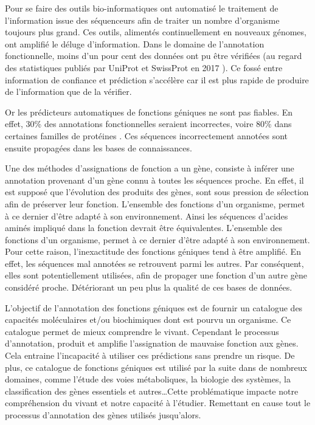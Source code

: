\begin{refsection}
Pour se faire des outils bio-informatiques ont automatisé le traitement de l'information issue des séquenceurs afin de traiter un nombre d'organisme toujours plus grand. Ces outils, alimentés continuellement en nouveaux génomes, ont amplifié le déluge d'information. Dans le domaine de l'annotation fonctionnelle, moins d'un pour cent des données ont pu être vérifiées (au regard des statistiques publiés par UniProt et SwissProt en 2017 \parencites{uniprot_stat}{expasy_stat} ). Ce fossé entre information de confiance et prédiction s'accélère car il est plus rapide de produire de l'information que de la vérifier.

Or les prédicteurs automatiques de fonctions géniques ne sont pas fiables. En effet, 30\% des annotations fonctionnelles seraient incorrectes, voire 80\% dans certaines familles de protéines \parencites{devos2001intrinsic}{schnoes2009annotation}. Ces séquences incorrectement annotées sont ensuite propagées dans les bases de connaissances.

Une des méthodes d'assignations de fonction a un gène, consiste à inférer une annotation provenant d'un gène connu à toutes les séquences proche. En effet, il est supposé que l'évolution des produits des gènes, sont sous pression de sélection afin de préserver leur fonction. L'ensemble des fonctions d'un organisme, permet à ce dernier d'être adapté à son environnement. Ainsi les séquences d'acides aminés impliqué dans la fonction devrait être équivalentes. L'ensemble des fonctions d'un organisme, permet à ce dernier d'être adapté à son environnement. Pour cette raison, l'inexactitude des fonctions géniques tend à être amplifié. En effet, les séquences mal annotées se retrouvent parmi les autres. Par conséquent, elles sont potentiellement utilisées, afin de propager une fonction d'un autre gène considéré proche. Détériorant un peu plus la qualité de ces bases de données.

L'objectif de l'annotation des fonctions géniques est de fournir un catalogue des capacités moléculaires et/ou biochimiques dont est pourvu un organisme. Ce catalogue permet de mieux comprendre le vivant. Cependant le processus d'annotation, produit et amplifie l'assignation de mauvaise fonction aux gènes. Cela entraine l'incapacité à utiliser ces prédictions sans prendre un risque. De plus, ce catalogue de fonctions géniques est utilisé par la suite dans de nombreux domaines, comme l'étude des voies métaboliques, la biologie des systèmes, la classification des gènes essentiels et autres\ldots Cette problématique impacte notre compréhension du vivant et notre capacité à l'étudier. Remettant en cause tout le processus d'annotation des gènes utilisés jusqu'alors.


\end{refsection}
